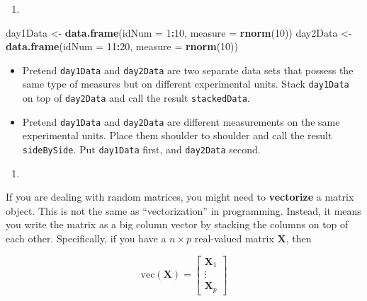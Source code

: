 \documentclass[12pt,krantz2]{krantz}
\makeatletter
\newenvironment{Shaded}{\begin{snugshade}}{\end{snugshade}}
\newcommand{\DataTypeTok}[1]{\textcolor[rgb]{0.27,0.27,0.27}{#1}}
\newcommand{\DecValTok}[1]{\textcolor[rgb]{0.06,0.06,0.06}{#1}}
\newcommand{\KeywordTok}[1]{\textcolor[rgb]{0.27,0.27,0.27}{\textbf{#1}}}
\newcommand{\NormalTok}[1]{#1}
\newcommand{\OperatorTok}[1]{\textcolor[rgb]{0.43,0.43,0.43}{\textbf{#1}}}
\newcommand{\StringTok}[1]{\textcolor[rgb]{0.5,0.5,0.5}{#1}}
\providecommand{\tightlist}{%
  \setlength{\itemsep}{0pt}\setlength{\parskip}{0pt}}
\newenvironment{kframe}{%
\medskip{}
\setlength{\fboxsep}{.8em}
 \def\at@end@of@kframe{}%
 \ifinner\ifhmode%
  \def\at@end@of@kframe{\end{minipage}}%
  \begin{minipage}{\columnwidth}%
 \fi\fi%
 \def\FrameCommand##1{\hskip\@totalleftmargin \hskip-\fboxsep
 \colorbox{shadecolor}{##1}\hskip-\fboxsep
     \hskip-\linewidth \hskip-\@totalleftmargin \hskip\columnwidth}%
 \MakeFramed {\advance\hsize-\width
   \@totalleftmargin\z@ \linewidth\hsize
   \@setminipage}}%
 {\par\unskip\endMakeFramed%
 \at@end@of@kframe}
\renewenvironment{Shaded}{\begin{kframe}}{\end{kframe}}
\makeatother
\begin{document}
\begin{enumerate}
\def\labelenumi{\arabic{enumi}.}
\setcounter{enumi}{1}
\item
\end{enumerate}

\begin{Shaded}
\begin{Highlighting}[]
\NormalTok{day1Data <-}\StringTok{ }\KeywordTok{data.frame}\NormalTok{(}\DataTypeTok{idNum =} \DecValTok{1}\OperatorTok{:}\DecValTok{10}\NormalTok{, }
                       \DataTypeTok{measure =} \KeywordTok{rnorm}\NormalTok{(}\DecValTok{10}\NormalTok{))}
\NormalTok{day2Data <-}\StringTok{ }\KeywordTok{data.frame}\NormalTok{(}\DataTypeTok{idNum =} \DecValTok{11}\OperatorTok{:}\DecValTok{20}\NormalTok{, }
                       \DataTypeTok{measure =} \KeywordTok{rnorm}\NormalTok{(}\DecValTok{10}\NormalTok{))}
\end{Highlighting}
\end{Shaded}

\begin{itemize}
\tightlist
\item
  Pretend \texttt{day1Data} and \texttt{day2Data} are two separate data sets that possess the same type of measures but on different experimental units. Stack \texttt{day1Data} on top of \texttt{day2Data} and call the result \texttt{stackedData}.
\item
  Pretend \texttt{day1Data} and \texttt{day2Data} are different measurements on the same experimental units. Place them shoulder to shoulder and call the result \texttt{sideBySide}. Put \texttt{day1Data} first, and \texttt{day2Data} second.
\end{itemize}

\begin{enumerate}
\def\labelenumi{\arabic{enumi}.}
\setcounter{enumi}{2}
\item
\end{enumerate}

If you are dealing with random matrices, you might need to \textbf{vectorize} a matrix object. This is not the same as ``vectorization'' in programming. Instead, it means you write the matrix as a big column vector by stacking the columns on top of each other. Specifically, if you have a \(n \times p\) real-valued matrix \(\mathbf{X}\), then

\begin{equation} 
\text{vec}(\mathbf{X}) =\begin{bmatrix} \mathbf{X}_1 \\ \vdots \\ \mathbf{X}_p \end{bmatrix} 
\end{equation}
\end{document}
